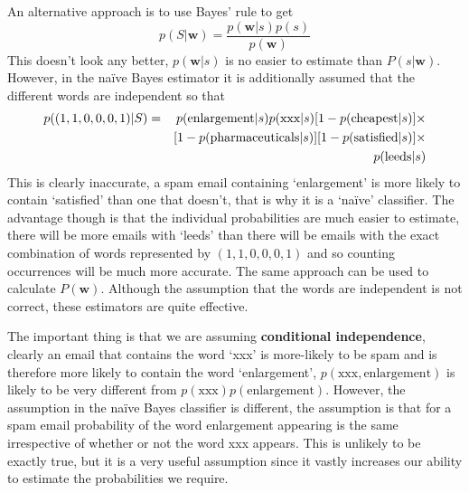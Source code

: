 \documentclass[12pt]{article}
\begin{document}
An alternative approach is to use Bayes' rule to get
\begin{equation}
p(S|\textbf{w})=\frac{p(\textbf{w}|s)p(s)}{p(\textbf{w})}
\end{equation}
This doesn't look any better, $p(\textbf{w}|s)$ is no easier to
estimate than $P(s|\textbf{w})$. However, in the na\"{i}ve Bayes
estimator it is additionally assumed that the different words are
independent so that 
\begin{eqnarray}
p((1,1,0,0,0,1)|S)&=&p(\mbox{enlargement}|s)p(\mbox{xxx}|s)[1-p(\mbox{cheapest}|s)]\times\cr&&[1-p(\mbox{pharmaceuticals}|s)][1-p(\mbox{satisfied}|s)]\times\cr&&p(\mbox{leeds}|s)
\end{eqnarray}
This is clearly inaccurate, a spam email containing
\lq{}enlargement\rq{} is more likely to contain \lq{}satisfied\rq{}
than one that doesn't, that is why it is a \lq{}na\"ive\rq{}
classifier. The advantage though is that the individual probabilities
are much easier to estimate, there will be more emails with
\lq{}leeds\rq{} than there will be emails with the exact
combination of words represented by $(1,1,0,0,0,1)$ and so counting
occurrences will be much more accurate. The same approach can be used
to calculate $P(\textbf{w})$. Although the assumption that the words
are independent is not correct, these estimators are quite effective. 

The important thing is that we are assuming \textbf{conditional
  independence}, clearly an email that contains the word `xxx' is
more-likely to be spam and is therefore more likely to contain the
word `enlargement', $p(\text{xxx},\text{enlargement})$ is likely to be
very different from $p(\text{xxx})p(\text{enlargement})$. However, the
assumption in the na\"{i}ve Bayes classifier is different, the
assumption is that for a spam email probability of the word
enlargement appearing is the same irrespective of whether or not the
word xxx appears. This is unlikely to be exactly true, but it is a
very useful assumption since it vastly increases our ability to
estimate the probabilities we require.
\end{document}
